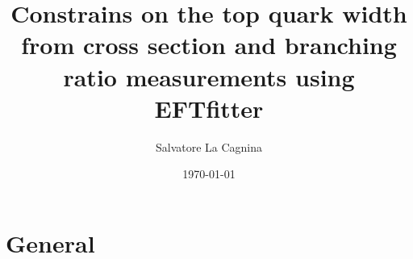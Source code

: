 \documentclass{beamer}
\title{Constrains on the top quark width from cross section and branching ratio measurements using EFTfitter}
\author{Salvatore La Cagnina}
\institute[TU Dortmund]{
\scriptsize Technische Universität Dortmund, Lehrstuhl EIV \\ 
\vspace{0.5cm}
}
\date{\today}
\begin{document}
\frame{\titlepage}


\section{General}
\end{document}
